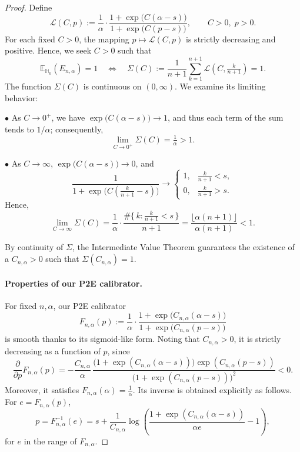 \documentclass{article}
\theoremstyle{plain}
\theoremstyle{definition}
\theoremstyle{remark}
\begin{document}
\begin{proof}
Define
\[
\mathcal{L}(C,p)
:= \frac{1}{\alpha} \cdot 
\frac{1 + \exp\!\big(C(\alpha - s)\big)}
     {1 + \exp\!\big(C(p - s)\big)},
\qquad C > 0, \; p > 0.
\]
For each fixed \(C > 0\), the mapping \(p \mapsto \mathcal{L}(C,p)\) is strictly decreasing and positive. 
Hence, we seek \(C > 0\) such that
\begin{equation}\label{star}
\mathbb{E}_{\mathbb{H}_0}\!\left(E_{n,\alpha}\right) = 1
\quad \Longleftrightarrow \quad
\Sigma(C) 
:= \frac{1}{n+1} \sum_{k=1}^{n+1} 
\mathcal{L}\!\left(C, \tfrac{k}{n+1}\right)
= 1.
\end{equation}
The function \(\Sigma(C)\) is continuous on \((0,\infty)\). 
We examine its limiting behavior:

\smallskip
\noindent
\(\bullet\) As \(C \to 0^+\), we have 
\(\exp\!\big(C(\alpha - s)\big) \to 1\), and thus each term of the sum tends to \(1/\alpha\); consequently, 
\[
\lim_{C \to 0^+} \Sigma(C) = \tfrac{1}{\alpha} > 1.
\]

\smallskip
\noindent
\(\bullet\) As \(C \to \infty\), \(\exp\!\big(C(\alpha - s)\big) \to 0\), and
\[
\frac{1}{1 + \exp\!\big(C(\tfrac{k}{n+1} - s)\big)} 
\longrightarrow 
\begin{cases}
1, & \tfrac{k}{n+1} < s,\\[4pt]
0, & \tfrac{k}{n+1} > s.
\end{cases}
\]
Hence,
\[
\lim_{C \to \infty} \Sigma(C)
= \frac{1}{\alpha} \cdot 
\frac{\#\{\,k : \tfrac{k}{n+1} < s\,\}}{n+1}
= \frac{\lfloor \alpha (n+1) \rfloor}{\alpha (n+1)} < 1.
\]

\smallskip
\noindent
By continuity of \(\Sigma\), the Intermediate Value Theorem guarantees the existence of a 
\(C_{n,\alpha} > 0\) such that \(\Sigma(C_{n,\alpha}) = 1\). 



\paragraph{Properties of our P2E calibrator.}
For fixed $n,\alpha$, our P2E calibrator
\[
F_{n,\alpha}(p)
:= \frac{1}{\alpha}\cdot
\frac{1+\exp\!\big(C_{n,\alpha}(\alpha-s)\big)}
     {1+\exp\!\big(C_{n,\alpha}(p-s)\big)}
\]
is smooth thanks to its sigmoid-like form. Noting that $C_{n,\alpha}>0$, it is strictly decreasing as a function of $p$, since
\[
\frac{\partial}{\partial p}F_{n,\alpha}(p)
=
-\frac{C_{n,\alpha}}{\alpha}\,
\frac{\big(1+\exp(C_{n,\alpha}(\alpha-s))\big)
      \exp(C_{n,\alpha}(p-s))}
     {\big(1+\exp(C_{n,\alpha}(p-s))\big)^2}
<0 .
\]
Moreover, it satisfies $F_{n,\alpha}(\alpha)=\frac{1}{\alpha}.$
Its inverse is obtained explicitly as follows. For $e=F_{n,\alpha}(p)$,
\[
p
=
F_{n,\alpha}^{-1}(e)
=
s+\frac{1}{C_{n,\alpha}}
\log\!\left(
\frac{1+\exp(C_{n,\alpha}(\alpha-s))}
     {\alpha e}
-1
\right),
\]
for $e$ in the range of $F_{n,\alpha}$.



\end{proof}
\end{document}
